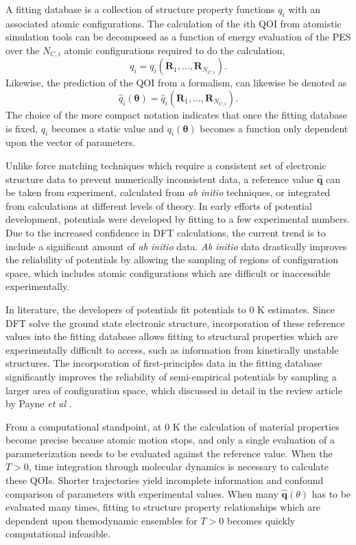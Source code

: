 A fitting database is a collection of structure property functions $q_i$ with an associated atomic configurations.	The calculation of the $i$th QOI from atomistic simulation tools can be decomposed as a function of energy evaluation of the PES over the $N_{C,i}$ atomic configurations required to do the calculation,
	\begin{equation}
		q_i = q_i(\bm{R}_1,...,\bm{R}_{N_{C,i}}).
	\end{equation}
Likewise, the prediction of the QOI from a formalism, can likewise be denoted as
	\begin{equation}
		\hat{q}_i(\bm{\theta}) = \hat{q}_i(\bm{R}_1,...,\bm{R}_{N_{C,i}}).
	\end{equation}
The choice of the more compact notation indicates that once the fitting database is fixed, $q_i$ becomes a static value and $\hat{q_i}(\bm{\theta})$ becomes a function only dependent upon the vector of parameters.

Unlike force matching techniques which require a consistent set of electronic structure data to prevent numerically inconsistent data\cite{behler2016_ml_pot}, a reference value $\hat{\bm{q}}$ can be taken from experiment, calculated from \emph{ab initio} techniques, or integrated from calculations at different levels of theory.  In early efforts of potential development, potentials were developed by fitting to a few experimental numbers.	Due to the increased confidence in DFT calculations, the current trend is to include a significant amount of \emph{ab initio} data.  \emph{Ab initio} data drastically improves the reliability of potentials by allowing the sampling of regions of configuration space, which includes atomic configurations which are difficult or inaccessible experimentally.

In literature, the developers of potentials fit potentials to $0$ K estimates.  Since DFT solve the ground state electronic structure, incorporation of these reference values into the fitting database allows fitting to structural properties which are experimentally difficult to access, such as information from kinetically unstable structures.  The incorporation of first-principles data in the fitting database significantly improves the reliability of semi-empirical potentials by sampling a larger area of configuration space, which discussed in detail in the review article by Payne \emph{et al} \cite{payne1996_dft_database}.

From a computational standpoint, at $0$ K the calculation of material properties become precise because atomic motion stops, and only a single evaluation of a parameterization needs to be evaluated against the reference value.  When the $T>0$, time integration through molecular dynamics is necessary to calculate these QOIs.  Shorter trajectories yield incomplete information and confound comparison of parameters with experimental values.  When many $\hat{\bm{q}}(\theta)$ has to be evaluated many times, fitting to structure property relationships which are dependent upon themodynamic ensembles for $T>0$ becomes quickly computational infeasible.

